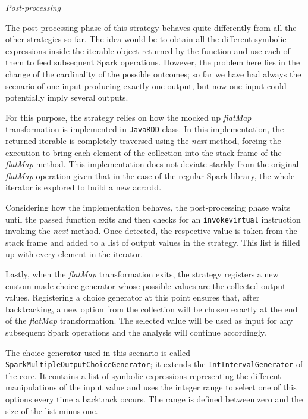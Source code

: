 \textit{Post-processing}

The post-processing phase of this strategy behaves quite differently from all the other strategies so far. The idea would be to obtain all the different symbolic expressions inside the iterable object returned by the function and use each of them to feed subsequent Spark operations. However, the problem here lies in the change of the cardinality of the possible outcomes; so far we have had always the scenario of one input producing exactly one output, but now one input could potentially imply several outputs.

For this purpose, the strategy relies on how the mocked up \textit{flatMap} transformation is implemented in \texttt{JavaRDD} class. In this implementation, the returned iterable is completely traversed using the \textit{next} method, forcing the execution to bring each element of the collection into the stack frame of the \textit{flatMap} method. This implementation does not deviate starkly from the original \textit{flatMap} operation given that in the case of the regular Spark library, the whole iterator is explored to build a new \acrshort{acr:rdd}.

Considering how the implementation behaves, the post-processing phase waits until the passed function exits and then checks for an \texttt{invokevirtual} instruction invoking the \textit{next} method. Once detected, the respective value is taken from the stack frame and added to a list of output values in the strategy. This list is filled up with every element in the iterator.

Lastly, when the \textit{flatMap} transformation exits, the strategy registers a new custom-made choice generator whose possible values are the collected output values. Registering a choice generator at this point ensures that, after backtracking, a new option from the collection will be chosen exactly at the end of the \textit{flatMap} transformation. The selected value will be used as input for any subsequent Spark operations and the analysis will continue accordingly.

The choice generator used in this scenario is called \texttt{SparkMultipleOutputChoiceGenerator}; it extends the \texttt{IntIntervalGenerator} of the \jpf{}
core. It contains a list of symbolic expressions representing the different manipulations of the input value and uses the integer range to select one of this options every time a backtrack occurs. The range is defined between zero and the size of the list minus one.